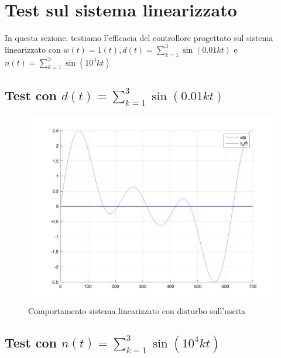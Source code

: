 \documentclass[a4paper, 11pt]{article}
\begin{document}
\vspace{19cm}

\section{Test sul sistema linearizzato}

In questa sezione, testiamo l'efficacia del controllore progettato sul sistema linearizzato con $w(t) = 1(t), d(t) = \sum_{k=1}^3 \sin(0.01kt)$ e $n(t) = \sum_{k=1}^3\sin(10^4kt)$

\subsection{\textbf{Test con $d(t) = \sum_{k=1}^3\sin(0.01kt)$}}

\begin{figure} [!h]
    \centering
    \includegraphics[scale = 0.25]{Immagini/Disturbo_uscita.jpg}
    \caption{Comportamento sistema linearizzato con disturbo sull'uscita}
    \label{fig:enter-label}
\end{figure}

\subsection{\textbf{Test con $n(t) = \sum_{k=1}^3\sin(10^4kt)$}}
\end{document}
